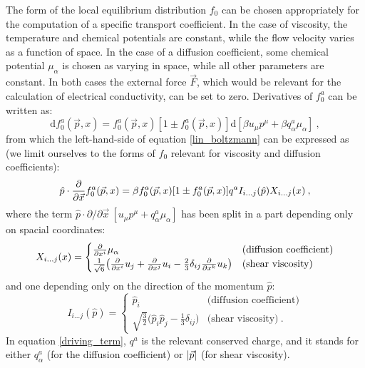 The form of the local equilibrium distribution $f_0$ can be chosen appropriately for the computation of a specific transport coefficient. In the case of viscosity, the temperature and chemical potentials are constant, while the flow velocity varies as a function of space. In the case of a diffusion coefficient, some chemical potential $\mu_{\alpha}$ is chosen as varying in space, while all other parameters are constant. In both cases the external force $\vec F$, which would be relevant for the calculation of electrical conductivity, can be set to zero. Derivatives of $f_0^a$ can be written as:
\begin{equation}
\mathrm d f_0^a(\vec p,x) = f_0^a(\vec p,x) [1 \pm f_0^a(\vec p,x)] \mathrm d [\beta u_{\mu}p^{\mu} + \beta q^a_{\alpha} \mu_{\alpha}] \: ,
\end{equation}
%
from which the left-hand-side of equation \ref{lin_boltzmann} can be expressed as (we limit ourselves to the forms of $f_0$ relevant for viscosity and diffusion coefficients):
\begin{equation}
 \hat p \cdot \frac{\partial  }{\partial \vec x} f^a_0(\vec p, x) = \beta f_0^a(\vec p,x) [1 \pm f_0^a(\vec p,x)] q^a I_{i \dots j} (\hat p) X_{i \dots j} (x) \: ,
\label{driving_term}
\end{equation}
%
where the term $ \hat p \cdot \partial /\partial \vec x \: [u_{\mu}p^{\mu} + q^a_{\alpha} \mu_{\alpha}]$ has been split in a part depending only on spacial coordinates:
\begin{equation}
X_{i \dots j} (x) =
\begin{cases}
\frac{\partial  }{\partial x^i} \mu_{\alpha} & \mbox{(diffusion coefficient)} \\
\frac{1}{\sqrt 6} \bigl( \frac{\partial  }{\partial x^i} u_j + \frac{\partial  }{\partial x^j} u_i -\frac{2}{3} \delta_{ij} \frac{\partial  }{\partial x^k} u_k \bigr) & \mbox{(shear viscosity)}
\end{cases}
\end{equation}
%
and one depending only on the direction of the momentum $\hat p$:
\begin{equation}
I_{i \dots j} (\hat p)=
\begin{cases}
\hat p_i & \mbox{(diffusion coefficient)} \\
\sqrt{\frac{3}{2}} \bigl(\hat p_i \hat p_j - \frac{1}{3}\delta_{ij} \bigr) & \mbox{(shear viscosity)} \: .
\end{cases}
\end{equation}
%
In equation \ref{driving_term}, $q^a$ is the relevant conserved charge, and it stands for either $q^a_{\alpha}$ (for the diffusion coefficient) or $\abs{\vec p}$ (for shear viscosity).

